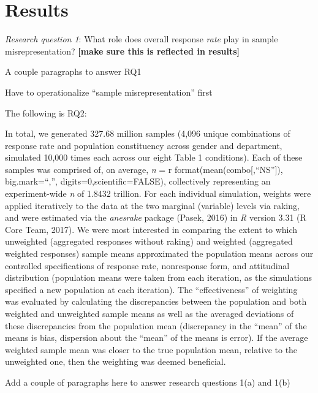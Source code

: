 \documentclass[
  ,man,floatsintext]{apa6}
\begin{document}
\hypertarget{results}{%
\section{Results}\label{results}}

\emph{Research question 1}: What role does overall response \emph{rate} play in sample misrepresentation? \textbf{{[}make sure this is reflected in results{]}}

A couple paragraphs to answer RQ1

Have to operationalize ``sample misrepresentation'' first

The following is RQ2:

In total, we generated 327.68 million samples (4,096 unique combinations of response rate and population constituency across gender and department, simulated 10,000 times each across our eight Table 1 conditions). Each of these samples was comprised of, on average, \emph{n} = r format(mean(combo{[},``NS''{]}), big.mark=``,'', digits=0,scientific=FALSE), collectively representing an experiment-wide \emph{n} of 1.8432 trillion. For each individual simulation, weights were applied iteratively to the data at the two marginal (variable) levels via raking, and were estimated via the \emph{anesrake} package (Pasek, 2016) in \emph{R} version 3.31 (R Core Team, 2017). We were most interested in comparing the extent to which unweighted (aggregated responses without raking) and weighted (aggregated weighted responses) sample means approximated the population means across our controlled specifications of response rate, nonresponse form, and attitudinal distribution (population means were taken from each iteration, as the simulations specified a new population at each iteration). The ``effectiveness'' of weighting was evaluated by calculating the discrepancies between the population and both weighted and unweighted sample means as well as the averaged deviations of these discrepancies from the population mean (discrepancy in the ``mean'' of the means is bias, dispersion about the ``mean'' of the means is error). If the average weighted sample mean was closer to the true population mean, relative to the unweighted one, then the weighting was deemed beneficial.

Add a couple of paragraphs here to answer research questions 1(a) and 1(b)
\end{document}
